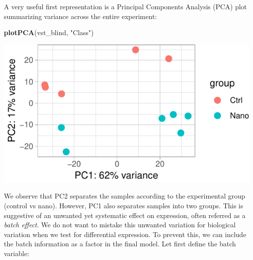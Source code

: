 \documentclass[9pt,a4paper,]{extarticle}
\newenvironment{Shaded}{\begin{snugshade}}{\end{snugshade}}
\newcommand{\KeywordTok}[1]{\textcolor[rgb]{0.13,0.29,0.53}{\textbf{{#1}}}}
\newcommand{\DataTypeTok}[1]{\textcolor[rgb]{0.13,0.29,0.53}{{#1}}}
\newcommand{\DecValTok}[1]{\textcolor[rgb]{0.00,0.00,0.81}{{#1}}}
\newcommand{\StringTok}[1]{\textcolor[rgb]{0.31,0.60,0.02}{{#1}}}
\newcommand{\CommentTok}[1]{\textcolor[rgb]{0.56,0.35,0.01}{\textit{{#1}}}}
\newcommand{\OtherTok}[1]{\textcolor[rgb]{0.56,0.35,0.01}{{#1}}}
\newcommand{\NormalTok}[1]{{#1}}
\begin{document}
A very useful first representation is a Principal Components Analysis (PCA) plot summarizing variance across the entire experiment:

\begin{Shaded}
\begin{Highlighting}[]
\KeywordTok{plotPCA}\NormalTok{(vst_blind, }\StringTok{"Class"}\NormalTok{)}
\end{Highlighting}
\end{Shaded}

\begin{center}\includegraphics{CAGEWorkflow_files/figure-latex/PCA-1} \end{center}

We observe that PC2 separates the samples according to the experimental group (control vs nano). However, PC1 also separates samples into two groups. This is suggestive of an unwanted yet systematic effect on expression, often referred as a \emph{batch effect}. We do not want to mistake this unwanted variation for biological variation when we test for differential expression. To prevent this, we can include the batch information as a factor in the final model. Let first define the batch variable:

\begin{Shaded}
\end{Shaded}
\end{document}
